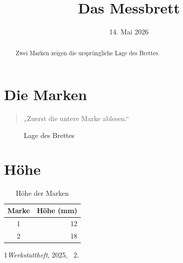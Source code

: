 \documentclass{article}
\begin{document}
\title{Das Messbrett}\author{}\date{14. Mai 2026}\maketitle
\begin{abstract}Zwei Marken zeigen die ursprüngliche Lage des Brettes.\end{abstract}
\tableofcontents
\section{Die Marken}\begin{quote}„Zuerst die untere Marke ablesen.“\end{quote}
\begin{figure}[ht]\centering\fbox{\rule{0pt}{8mm}\rule{33mm}{0pt}}\caption{Lage des Brettes}\end{figure}
\section{Höhe}
\begin{table}[ht]\centering\begin{tabular}{cr}Marke&Höhe (mm)\\\hline 1&12\\2&18\end{tabular}\caption{Höhe der Marken}\end{table}
\begin{thebibliography}{1}\emph{Werkstattheft}, 2025, \chaptername~2.\end{thebibliography}
\end{document}
